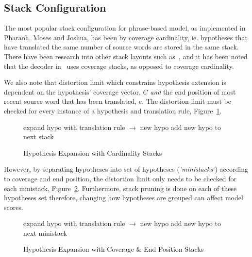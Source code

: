 \documentclass[11pt]{article}
\begin{document}
\subsection{Stack Configuration}

The most popular stack configuration for phrase-based model, as implemented in Pharaoh, Moses and Joshua, has been by coverage cardinality, ie. hypotheses that have translated the same number of source words are stored in the same stack. There have been research into other stack layouts such as~\cite{ortizmartinez-garciavarea-casacuberta:2006:WMT}, and it has been noted that the decoder in~\cite{Brown:1993} uses coverage stacks, as opposed to coverage cardinality. 

We also note that distortion limit which constrains hypothesis extension is dependent on the hypothesis' coverage vector, $C$ \emph{and} the end position of most recent source word that has been translated, $e$. The distortion limit must be checked for every instance of a hypothesis and translation rule, Figure~\ref{algo:Hypothesis Expansion with Unsorted Stack}.
\begin{figure} [h]
\begin{algorithmic}
	\STATE expand hypo with translation rule $\rightarrow$ new hypo
	\STATE add new hypo to next stack
      \ENDIF
  \ENDFOR %
\ENDFOR %
\end{algorithmic}
\caption{Hypothesis Expansion with Cardinality Stacks}
\label{algo:Hypothesis Expansion with Unsorted Stack}
\end{figure}
However, by separating hypotheses into set of hypotheses (\emph{'ministacks'}) according to coverage and end position, the distortion limit only needs to be checked for each ministack, Figure~\ref{algo:Hypothesis Expansion with Sorted Stack}. Furthermore, stack pruning is done on each of these hypotheses set therefore, changing how hypotheses are grouped can affect model scores. 
\begin{figure} [h]
\begin{algorithmic}
	\STATE expand hypo with translation rule $\rightarrow$ new hypo
	\STATE add new hypo to next ministack
      \ENDFOR
    \ENDIF
  \ENDFOR %
\ENDFOR %
\end{algorithmic}
\caption{Hypothesis Expansion with Coverage \& End Position Stacks}
\label{algo:Hypothesis Expansion with Sorted Stack}
\end{figure}
\end{document}
